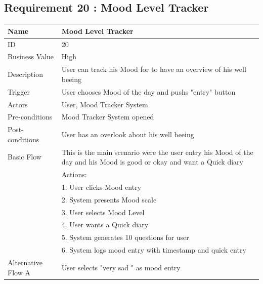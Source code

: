 \documentclass{article}
\begin{document}
\clearpage


\subsection{Requirement 20 : Mood Level Tracker}

\begin{table}[h!]
    \begin{tabularx}{\textwidth}{|>{\raggedright\arraybackslash}p{}|X|}
        \hline
        Name             & Mood Level Tracker                               \\ \hline
        ID               & 20                                                                                      \\ \hline
        Business Value   & High                                                                                   \\ \hline
        Description      & User can track his Mood for to have an overview of his well beeing  \\ \hline
        Trigger          & User chooses Mood of the day and pushs "entry" button \\ \hline
        Actors           & User, Mood Tracker System                               \\ \hline
        Pre-conditions   & Mood Tracker System opened                                   \\ \hline
        Post-conditions  & User has an overlook about his well beeing                                                       \\ \hline
        Basic Flow       & This is the main scenario were the user entry his Mood of the day and his Mood is good or okay and want a Quick diary \\ \hline
                         & Actions: \\
                         & 1. User clicks Mood entry\\
                         & 2. System presents Mood scale \\
                         & 3. User selects Mood Level \\
                         & 4. User wants a Quick diary \\
                         & 5. System generates 10 questions for user \\
                         & 6. System logs mood entry with timestamp and quick entry\\ \hline
        Alternative Flow A & User selects "very sad " as mood entry \\

\end{tabularx}
\end{table}
\end{document}

